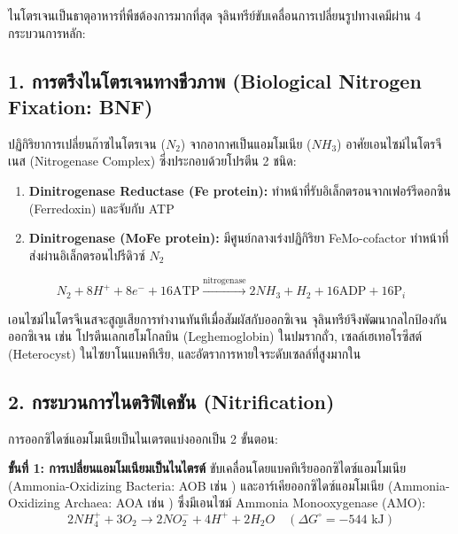ไนโตรเจนเป็นธาตุอาหารที่พืชต้องการมากที่สุด จุลินทรีย์ขับเคลื่อนการเปลี่ยนรูปทางเคมีผ่าน 4 กระบวนการหลัก:

\subsection{1. การตรึงไนโตรเจนทางชีวภาพ (Biological Nitrogen Fixation: BNF)}

ปฏิกิริยาการเปลี่ยนก๊าซไนโตรเจน ($N_2$) จากอากาศเป็นแอมโมเนีย ($NH_3$) อาศัยเอนไซม์ไนโตรจีเนส (Nitrogenase Complex) ซึ่งประกอบด้วยโปรตีน 2 ชนิด:
\begin{enumerate}
    \item \textbf{Dinitrogenase Reductase (Fe protein):} ทำหน้าที่รับอิเล็กตรอนจากเฟอร์รีดอกซิน (Ferredoxin) และจับกับ ATP
    \item \textbf{Dinitrogenase (MoFe protein):} มีศูนย์กลางเร่งปฏิกิริยา FeMo-cofactor ทำหน้าที่ส่งผ่านอิเล็กตรอนไปรีดิวซ์ $N_2$
\end{enumerate}

\begin{equation}
N_2 + 8H^+ + 8e^- + 16\text{ATP} \xrightarrow{\text{nitrogenase}} 2NH_3 + H_2 + 16\text{ADP} + 16\text{P}_i
\label{eq:bnf_full}
\end{equation}

เอนไซม์ไนโตรจีเนสจะสูญเสียการทำงานทันทีเมื่อสัมผัสกับออกซิเจน จุลินทรีย์จึงพัฒนากลไกป้องกันออกซิเจน เช่น โปรตีนเลกเฮโมโกลบิน (Leghemoglobin) ในปมรากถั่ว, เซลล์เฮเทอโรซีสต์ (Heterocyst) ในไซยาโนแบคทีเรีย, และอัตราการหายใจระดับเซลล์ที่สูงมากใน 

\subsection{2. กระบวนการไนตริฟิเคชัน (Nitrification)}

การออกซิไดซ์แอมโมเนียเป็นไนเตรตแบ่งออกเป็น 2 ขั้นตอน:

\textbf{ขั้นที่ 1: การเปลี่ยนแอมโมเนียมเป็นไนไตรต์} ขับเคลื่อนโดยแบคทีเรียออกซิไดซ์แอมโมเนีย (Ammonia-Oxidizing Bacteria: AOB เช่น ) และอาร์เคียออกซิไดซ์แอมโมเนีย (Ammonia-Oxidizing Archaea: AOA เช่น ) ซึ่งมีเอนไซม์ Ammonia Monooxygenase (AMO):
\begin{equation}
2NH_4^+ + 3O_2 \rightarrow 2NO_2^- + 4H^+ + 2H_2O \quad (\Delta G^\circ = -544\text{ kJ})
\end{equation}


